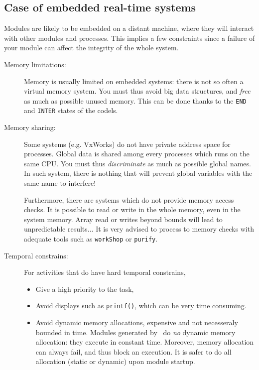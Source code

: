 \subsection{Case of embedded real-time systems}

Modules are likely  to be embedded on  a distant machine, where they will
interact  with other modules  and     processes.   This implies a     few
constraints since a  failure of your module can  affect the integrity  of
the whole system.

\begin{description}
\item[Memory limitations:]
Memory is  usually limited on  embedded systems: there is  not so often a
virtual memory system. You must thus avoid big  data structures, and {\em
free} as much as  possible unused memory. This  can be done thanks to the
\texttt{END} and \texttt{INTER} states of the codels.

\item[Memory sharing:]
Some  systems (e.g. VxWorks)   do not  have   private address  space  for
processes. Global data is shared among every processes  which runs on the
same CPU. You  must thus \emph{discriminate} as  much  as possible global
names.  In   such system, there   is nothing  that will   prevent  global
variables with the same name to interfere!

Furthermore, there are systems which do not provide memory access checks.
It is possible to read or write  in the whole memory,  even in the system
memory.  Array read or writes   beyond bounds will  lead to unpredictable
results...  It is very advised to  process to memory checks with adequate
tools such as \texttt{workShop} or \texttt{purify}.

\item[Temporal constrains:]

For activities that do have hard temporal constrains,
\begin{itemize}
\item Give a high priority to the task,
\item Avoid displays such as \texttt{printf()}, which can be very time
consuming.
\item Avoid dynamic memory allocations, expensive and not necesseraly
bounded in time.  Modules generated by \GenoM\ do \emph{no} dynamic memory
allocation: they execute in  constant time.  Moreover, memory  allocation
can always fail, and  thus block  an execution.  It  is  safer to do  all
allocation (static or dynamic) upon module startup.
\end{itemize} 


\end{description}
